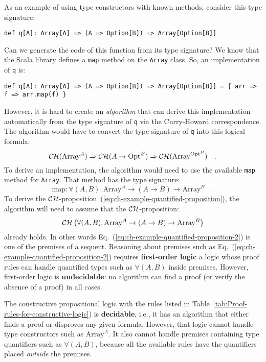 As an example of using type constructors with known methods, consider
this type signature:
\begin{lstlisting}
def q[A]: Array[A] => (A => Option[B]) => Array[Option[B]]
\end{lstlisting}
Can we generate the code of this function from its type signature?
We know that the Scala library defines a \lstinline!map! method on
the \lstinline!Array! class. So, an implementation of \lstinline!q!
is:
\begin{lstlisting}
def q[A]: Array[A] => (A => Option[B]) => Array[Option[B]] = { arr => f => arr.map(f) }
\end{lstlisting}
However, it is hard to create an \emph{algorithm} that can derive
this implementation automatically from the type signature of \lstinline!q!
via the Curry-Howard correspondence. The algorithm would have to convert
the type signature of \lstinline!q! into this logical formula:
\begin{equation}
{\cal CH}(\text{Array}^{A})\Rightarrow{\cal CH}(A\rightarrow\text{Opt}^{B})\Rightarrow{\cal CH}(\text{Array}^{\text{Opt}^{B}})\quad.\label{eq:ch-example-quantified-proposition}
\end{equation}
To derive an implementation, the algorithm would need to use the available
\lstinline!map! method for \lstinline!Array!. That method has the
type signature:
\[
\text{map}:\forall(A,B).\,\text{Array}^{A}\rightarrow\left(A\rightarrow B\right)\rightarrow\text{Array}^{B}\quad.
\]
To derive the ${\cal CH}$-proposition~(\ref{eq:ch-example-quantified-proposition}),
the algorithm will need to assume that the ${\cal CH}$-proposition:
\begin{equation}
{\cal CH}\,\big(\forall(A,B).\,\text{Array}^{A}\rightarrow\left(A\rightarrow B\right)\rightarrow\text{Array}^{B}\big)\label{eq:ch-example-quantified-proposition-2}
\end{equation}
already holds. In other words Eq.~(\ref{eq:ch-example-quantified-proposition-2})
is one of the premises of a sequent. Reasoning about premises such
as Eq.~(\ref{eq:ch-example-quantified-proposition-2}) requires \textbf{first-order
logic} \textemdash{} a logic whose proof rules can handle quantified
types such as $\forall(A,B)$\emph{ }inside premises. However, first-order
logic is \textbf{undecidable}: no algorithm
can find a proof (or verify the absence of a proof) in all cases. 

The constructive propositional logic with the rules listed in Table~\ref{tab:Proof-rules-for-constructive-logic})
is \textbf{decidable}, i.e., it has an algorithm
that either finds a proof or disproves any given formula. However,
that logic cannot handle type constructors such as $\text{Array}^{A}$.
It also cannot handle premises containing type quantifiers such as
$\forall(A,B)$, because all the available rules have the quantifiers
placed \emph{outside} the premises. 

